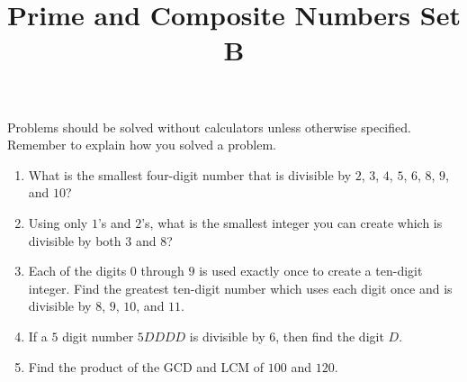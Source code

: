 \documentclass[twocolumn]{article}
\title{Prime and Composite Numbers Set B}
\date{}
\author{}
\begin{document}
\maketitle
\noindent Problems should be solved without calculators unless otherwise specified.
Remember to explain how you solved a problem.
\begin{enumerate}
    \item What is the smallest four-digit number that is divisible by $2$, $3$, $4$, $5$, $6$,
        $8$, $9$, and $10$?
        \vspace{3cm}
    \item Using only $1$'s and $2$'s, what is the smallest integer you can create which is
        divisible by both $3$ and $8$?
        \vspace{3cm}
    \item Each of the digits $0$ through $9$ is used exactly once to create a ten-digit integer.
        Find the greatest ten-digit number which uses each digit once and is divisible by $8$, $9$,
        $10$, and $11$.
        \vspace{3cm}
    \item If a $5$ digit number $5DDDD$ is divisible by $6$, then find the digit $D$.
        \vspace{3cm}
    \item Find the product of the GCD and LCM of $100$ and $120$.
        \vspace{3cm}
\end{enumerate}
\end{document}

